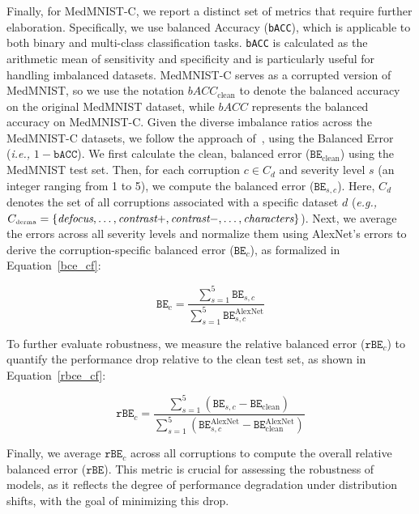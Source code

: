\documentclass[times,twocolumn,final]{elsarticle}
\begin{document}
Finally, for MedMNIST-C, we report a distinct set of metrics that require further elaboration. Specifically, we use balanced Accuracy (\texttt{bACC}), which is applicable to both binary and multi-class classification tasks. \texttt{bACC} is calculated as the arithmetic mean of sensitivity and specificity and is particularly useful for handling imbalanced datasets.
MedMNIST-C serves as a corrupted version of MedMNIST, so we use the notation $bACC_{\text{clean}}$ to denote the balanced accuracy on the original MedMNIST dataset, while $bACC$ represents the balanced accuracy on MedMNIST-C. Given the diverse imbalance ratios across the MedMNIST-C datasets, we follow the approach of~\cite{di2024medmnist}, using the Balanced Error (\textit{i.e.,} $1 - \texttt{bACC}$).
We first calculate the clean, balanced error ($\texttt{BE}_{\text{clean}}$) using the MedMNIST test set. Then, for each corruption $c \in C_d$ and severity level $s$ (an integer ranging from 1 to 5), we compute the balanced error ($\texttt{BE}_{s,c}$). Here, $C_d$ denotes the set of all corruptions associated with a specific dataset $d$ (\textit{e.g.,} $C_{\text{\tiny{derma}}} = \{\textit{defocus}, \dots, \textit{contrast}+, \textit{contrast}-, \dots, \textit{characters}\}$).
Next, we average the errors across all severity levels and normalize them using AlexNet's errors to derive the corruption-specific balanced error ($\texttt{BE}_c$), as formalized in Equation~\ref{bce_cf}:

\begin{equation}
\texttt{BE}_c = \frac{\sum_{s=1}^5 \texttt{BE}_{s,c}}{\sum_{s=1}^5 \texttt{BE}_{s,c}^{\text{AlexNet}}}
\label{bce_cf}
\end{equation}

To further evaluate robustness, we measure the relative balanced error ($\texttt{rBE}_c$) to quantify the performance drop relative to the clean test set, as shown in Equation~\ref{rbce_cf}:

\begin{equation}
\texttt{rBE}_c = \frac{\sum_{s=1}^5 (\texttt{BE}_{s,c} - \texttt{BE}_{\text{clean}})}{\sum_{s=1}^5 (\texttt{BE}_{s,c}^{\text{AlexNet}} - \texttt{BE}_{\text{clean}}^{\text{AlexNet}})}
\label{rbce_cf}
\end{equation}

Finally, we average $\texttt{rBE}_c$ across all corruptions to compute the overall relative balanced error ($\texttt{rBE}$). This metric is crucial for assessing the robustness of models, as it reflects the degree of performance degradation under distribution shifts, with the goal of minimizing this drop.
\end{document}
